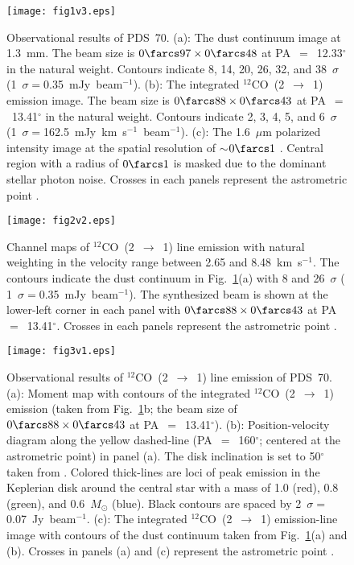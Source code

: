 \documentclass[apj]{emulateapj-rtx4}
\begin{document}
\clearpage

 \begin{figure}
   \centering
   \texttt{[image: fig1v3.eps]}
   \caption{Observational results of PDS~70.
     (a): The dust continuum image at 1.3~mm.
     The beam size is $0\farcs97\times0\farcs48$ at PA~$=$~12.33$^{\circ}$ in the natural weight.
     Contours indicate 8, 14, 20, 26, 32, and 38~$\sigma$ (1~$\sigma =$0.35~mJy~beam$^{-1}$).
     (b): The integrated $^{12}$CO~(2~$\rightarrow$~1) emission image.
     The beam size is $0\farcs88\times0\farcs43$ at PA~$=$~13.41$^{\circ}$ in the natural weight.
     Contours indicate 2, 3, 4, 5, and 6~$\sigma$ (1~$\sigma =$162.5~mJy~km~s$^{-1}$~beam$^{-1}$).
     (c): The 1.6~$\mu$m polarized intensity image at the spatial resolution of $\sim$$0\farcs1$
     \citep{hash12}. Central region with a radius of $0\farcs1$
     is masked due to the dominant stellar photon noise. Crosses in each panels represent the astrometric point
     \citep[14:08:10.125, $-$41:23:52.81;][]{cutr13}.
   }\label{res:dust_pds70}
 \end{figure}

\clearpage

 \begin{figure}
   \centering
   \texttt{[image: fig2v2.eps]}
   \caption{
     Channel maps of $^{12}$CO~(2~$\rightarrow$~1) line emission with natural weighting in the velocity range between 
     2.65 and 8.48~km~s$^{-1}$. The contours indicate the dust continuum in Fig.~\ref{res:dust_pds70}(a) with 8 and 26~$\sigma$ (
     1~$\sigma =$0.35~mJy~beam$^{-1}$). The synthesized beam is shown at the lower-left corner in each panel with
     $0\farcs88\times0\farcs43$ at PA~$=$~13.41$^{\circ}$. Crosses in each panels represent the astrometric point
     \citep[14:08:10.125, $-$41:23:52.81;][]{cutr13}.
   }\label{res:vel}
 \end{figure}

\clearpage

 \begin{figure}
   \centering
   \texttt{[image: fig3v1.eps]}
   \caption{
     Observational results of $^{12}$CO~(2~$\rightarrow$~1) line emission of PDS~70.
     (a): Moment map with contours of the integrated $^{12}$CO~(2~$\rightarrow$~1) emission (taken from Fig.~\ref{res:dust_pds70}b;
     the beam size of $0\farcs88\times0\farcs43$ at PA~$=$~13.41$^{\circ}$). 
     (b): Position-velocity diagram along the yellow dashed-line (PA~$=$~160$^{\circ}$; centered at the astrometric point) 
     in panel (a). The disk inclination is set to 50$^{\circ}$ taken from \citet{hash12}. Colored thick-lines are loci of 
     peak emission in the Keplerian disk around the central star with a mass of 1.0 (red), 0.8 (green), and 0.6~$M_{\odot}$ (blue).
     Black contours are spaced by 2~$\sigma =$0.07~Jy~beam$^{-1}$.
     (c): The integrated $^{12}$CO~(2~$\rightarrow$~1) emission-line image with contours of the dust continuum taken from
     Fig.~\ref{res:dust_pds70}(a) and (b). Crosses in panels (a) and (c) represent the astrometric point
     \citep[14:08:10.125, $-$41:23:52.81;][]{cutr13}.
   }\label{res:gas}
 \end{figure}
\end{document}

